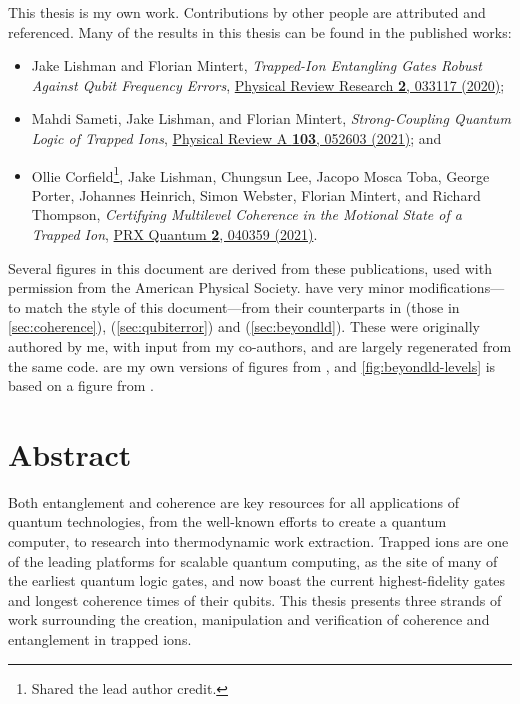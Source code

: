 \documentclass[a4paper,12pt,oneside,british]{scrbook}
\begin{document}
This thesis is my own work.
Contributions by other people are attributed and referenced.
Many of the results in this thesis can be found in the published works:
\begin{itemize}[topsep=0.2\baselineskip,itemsep=0pt]
    \item Jake Lishman and Florian Mintert, \textit{Trapped-Ion Entangling Gates Robust Against Qubit Frequency Errors}, \href{https://doi.org/10.1103/PhysRevResearch.2.033117}{Physical Review Research \textbf{2}, 033117 (2020)}\nocite{Lishman2020};
%
    \item Mahdi Sameti, Jake Lishman, and Florian Mintert, \textit{Strong-Coupling Quantum Logic of Trapped Ions}, \href{https://doi.org/10.1103/PhysRevA.103.052603}{Physical Review A \textbf{103}, 052603 (2021)}\nocite{Sameti2021}; and
%
    \item Ollie Corfield\footnote{\label{foot:equal}Shared the lead author credit.}, Jake Lishman, Chungsun Lee, Jacopo Mosca Toba, George Porter, Johannes Heinrich, Simon Webster, Florian Mintert, and Richard Thompson, \textit{Certifying Multilevel Coherence in the Motional State of a Trapped Ion}, \href{https://doi.org/10.1103/PRXQuantum.2.040359}{PRX Quantum \textbf{2}, 040359 (2021)}\nocite{Corfield2021}.
\end{itemize}
Several figures in this document are derived from these publications, used with permission from the American Physical Society.
 have very minor modifications---to match the style of this document---from their counterparts in \citet{Corfield2021} (those in \cref{sec:coherence}), \citet{Lishman2020} (\cref{sec:qubiterror}) and \citet*{Sameti2021} (\cref{sec:beyondld}).
These were originally authored by me, with input from my co-authors, and are largely regenerated from the same code.
 are my own versions of figures from \citet{Corfield2021}, and \cref{fig:beyondld-levels} is based on a figure from \citet*{Sameti2021}.


\chapter*{Abstract}

Both entanglement and coherence are key resources for all applications of quantum technologies, from the well-known efforts to create a quantum computer, to research into thermodynamic work extraction.
Trapped ions are one of the leading platforms for scalable quantum computing, as the site of many of the earliest quantum logic gates, and now boast the current highest-fidelity gates and longest coherence times of their qubits.
This thesis presents three strands of work surrounding the creation, manipulation and verification of coherence and entanglement in trapped ions.
\end{document}
